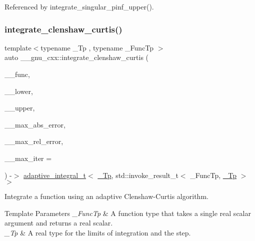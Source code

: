 Referenced by integrate\+\_\+singular\+\_\+pinf\+\_\+upper().

\mbox{\label{namespace____gnu__cxx_ad578040e44241fb45ed76360108667e9}} 
\subsubsection{\texorpdfstring{integrate\+\_\+clenshaw\+\_\+curtis()}{integrate\_clenshaw\_curtis()}}
{\footnotesize\ttfamily template$<$typename \+\_\+\+Tp , typename \+\_\+\+Func\+Tp $>$ \\
auto \+\_\+\+\_\+gnu\+\_\+cxx\+::integrate\+\_\+clenshaw\+\_\+curtis (\begin{DoxyParamCaption}\item[{\+\_\+\+Func\+Tp}]{\+\_\+\+\_\+func,  }\item[{\hyperlink{namespace____gnu__cxx_a3b19a9c800ca194374ef9172290f7d79}{\+\_\+\+Tp}}]{\+\_\+\+\_\+lower,  }\item[{\hyperlink{namespace____gnu__cxx_a3b19a9c800ca194374ef9172290f7d79}{\+\_\+\+Tp}}]{\+\_\+\+\_\+upper,  }\item[{\hyperlink{namespace____gnu__cxx_a3b19a9c800ca194374ef9172290f7d79}{\+\_\+\+Tp}}]{\+\_\+\+\_\+max\+\_\+abs\+\_\+error,  }\item[{\hyperlink{namespace____gnu__cxx_a3b19a9c800ca194374ef9172290f7d79}{\+\_\+\+Tp}}]{\+\_\+\+\_\+max\+\_\+rel\+\_\+error,  }\item[{std\+::size\+\_\+t}]{\+\_\+\+\_\+max\+\_\+iter = {} }\end{DoxyParamCaption}) -\/$>$  \hyperlink{struct____gnu__cxx_1_1adaptive__integral__t}{adaptive\+\_\+integral\+\_\+t}$<$ \hyperlink{namespace____gnu__cxx_a3b19a9c800ca194374ef9172290f7d79}{\+\_\+\+Tp}, std\+::invoke\+\_\+result\+\_\+t$<$ \+\_\+\+Func\+Tp, \hyperlink{namespace____gnu__cxx_a3b19a9c800ca194374ef9172290f7d79}{\+\_\+\+Tp} $>$$>$}

Integrate a function using an adaptive Clenshaw-\/\+Curtis algorithm.


\begin{DoxyTemplParams}{Template Parameters}
{\em \+\_\+\+Func\+Tp} & A function type that takes a single real scalar argument and returns a real scalar. \\
\hline
{\em \+\_\+\+Tp} & A real type for the limits of integration and the step. \\
\hline
\end{DoxyTemplParams}


